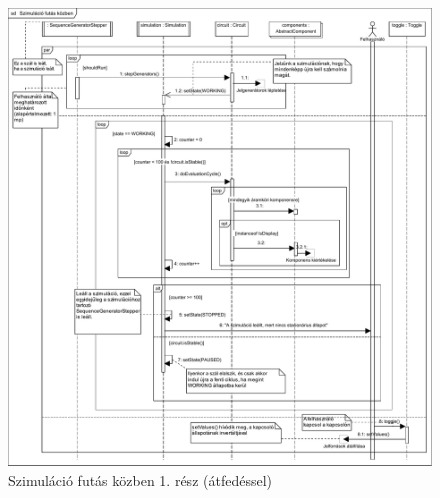 \begin{figure}[H]
\begin{center}
\includegraphics*[width = 23.5cm, angle = 90, viewport = 0 375 830 900]{chapters/chapter03/seqdiagrams/sim_running.pdf}
\caption{Szimuláció futás közben 1. rész (átfedéssel)}
\label{fig:sim_running1}
\end{center}
\end{figure}

